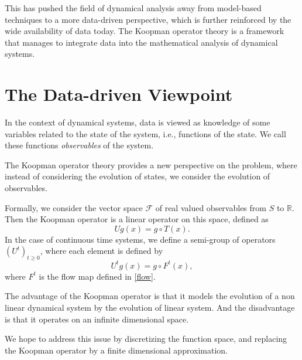 \documentclass{article}
\def\R{\mathbb{R}}
\begin{document}
This has pushed the field of dynamical analysis away from model-based
techniques to a more data-driven perspective, which is further reinforced by
the wide availability of data today.
The Koopman operator theory is a framework that manages to integrate data into
the mathematical analysis of dynamical systems.

\section{The Data-driven Viewpoint}%
\label{sec:the_data_driven_viewpoint}

In the context of dynamical systems, data is viewed as knowledge of some
variables related to the state of the system, i.e., functions of the state.
We call these functions \textit{observables} of the system.

The Koopman operator theory provides a new perspective on the problem, where
instead of considering the evolution of states, we consider the evolution
of observables.

Formally, we consider the vector space $\mathcal{F}$ of real valued observables
from $S$ to $\R$.
Then the Koopman operator is a linear operator on this space, defined as
\begin{equation}
    Ug(x) = g\circ T(x).
\end{equation}
In the case of continuous time systems, we define a semi-group of operators
$(U^t)_{t \geq 0}$, where each element is defined by
\begin{equation}
    U^t g (x) = g\circ F^t(x),
\end{equation}
where $F^t$ is the flow map defined in \eqref{flow}.

The advantage of the Koopman operator is that it models the evolution of a
non linear dynamical system by the evolution of linear system.
And the disadvantage is that it operates on an infinite dimensional space.

We hope to address this issue by discretizing the function space, and replacing
the Koopman operator by a finite dimensional approximation.
\end{document}

